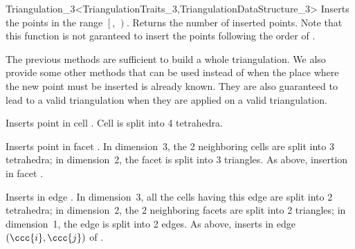 \begin{ccRefClass}{Triangulation_3<TriangulationTraits_3,TriangulationDataStructure_3>}
{Inserts the points in the range $\left[\right.$,
$\left.\right)$.  Returns the number of inserted points.
Note that this function is not garanteed to insert the points
following the order of .
}

The previous methods are sufficient to build a whole triangulation. We
also provide some other methods that can be used instead of
 when the place where the new point  must be inserted
is already known. They are also guaranteed to lead to a valid
triangulation when they are applied on a valid triangulation.

{Inserts point  in cell . Cell  is split into 4
tetrahedra.
} 

{Inserts point  in facet . In dimension~3, the 2
neighboring cells are split into 3 tetrahedra; in dimension~2, the facet 
is split into 3 triangles.
}
\ccGlue
{}
{As above, insertion in facet .
}

{Inserts  in edge . In dimension~3, 
all the cells having this edge are split into 2 tetrahedra; in
dimension~2, the 2 neighboring facets are split into 2 triangles; in
dimension~1, the edge is split into 2 edges.
}
\ccGlue
{} 
{As above, inserts  in edge $(\ccc{i}, \ccc{j})$ of .
} 


\end{ccRefClass}
